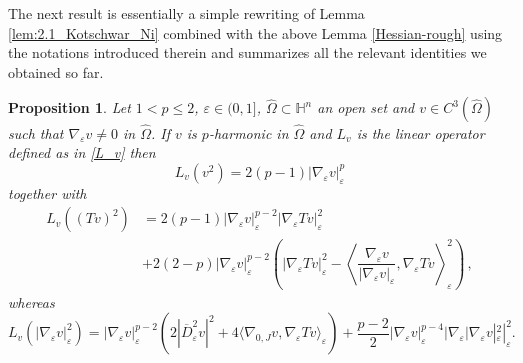 \documentclass[10pt]{amsart}
\numberwithin{equation}{section}
\newtheorem{proposition}[theorem]{Proposition}
\newtheorem{lemma}[theorem]{Lemma}
\theoremstyle{definition}
\newcommand{\eps}{\varepsilon}
\newcommand{\He}{\mathbb{H}}
\newcommand{\egrad}{\nabla_{\eps}}
\begin{document}
The next result is essentially a simple rewriting of Lemma \ref{lem:2.1_Kotschwar_Ni} combined with the above Lemma \ref{Hessian-rough} using the notations introduced therein and summarizes all the relevant identities we obtained so far. 


\begin{proposition}\label{lem:Bochner_riscritta}
	Let $1<p \leq 2$, $\varepsilon \in (0,1]$, $\widehat{\Omega} \subset \He^n$ an open set and $v\in C^3(\widehat{\Omega})$ such that $\nabla_\varepsilon v \neq 0$ in $\widehat{\Omega}$. If $v$ is $p$-harmonic in $\widehat{\Omega}$ and $L_v$ is the linear operator defined as in \eqref{L_v} then 
	\begin{equation}\label{eq:Lv_di_v2}
		L_{v}(v^2) = 2(p-1) |\nabla_{\varepsilon}v|_{\varepsilon}^{p} 
	\end{equation}
	\noindent together with
	\begin{equation}\label{eq:Lv_di_Tv2}
		\begin{aligned}
			L_{v}((T v)^2) &= 2(p-1)|\nabla_{\varepsilon}v|_{\varepsilon}^{p-2}|\nabla_{\varepsilon}T v|^{2}_{\varepsilon} \\
			&+ 2(2-p)|\nabla_{\varepsilon}v|^{p-2}_{\varepsilon} \left(|\nabla_{\varepsilon}T v|^{2}_{\varepsilon} - \left\langle\dfrac{\nabla_{\varepsilon}v}{|\nabla_{\varepsilon}v|_{\varepsilon}}, \nabla_{\varepsilon}T v\right\rangle_{\varepsilon}^2\right) \, ,
		\end{aligned}
	\end{equation}
	whereas
	\begin{equation}
		\label{eq:KN-identity-Improved}
		L_v(|\egrad v|_\varepsilon^2) = |\egrad v|_\varepsilon^{p-2} \left( 2|\overline{D}^2_{\varepsilon}v|^2 + 4 \langle \nabla_{0,J}v, \nabla_{\varepsilon}T v \rangle_{\varepsilon} \right) + \dfrac{p-2}{2} |\egrad v|_\varepsilon^{p-4} |\egrad |\egrad v|_\varepsilon^2|_\varepsilon^{2}.
	\end{equation}
	\end{proposition}	
	
\end{document}
